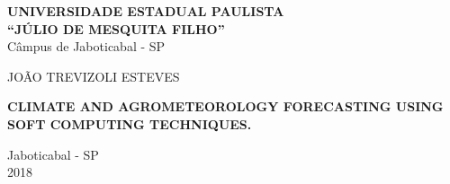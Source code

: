 \thispagestyle{empty}


\begin{center}
\textbf{UNIVERSIDADE ESTADUAL PAULISTA}\\
\textbf{``JÚLIO DE MESQUITA FILHO''}\\
Câmpus de Jaboticabal - SP
\end{center}

\vspace{3.5cm}
\centerline{{\normalsize{JOÃO TREVIZOLI ESTEVES}}}

\vspace*{4.5cm}


\begin{center}
\Large\textrm{\textbf{CLIMATE AND AGROMETEOROLOGY FORECASTING USING SOFT COMPUTING TECHNIQUES.}} %
\end{center}


\vspace*{9.0cm}
\begin{center}
Jaboticabal - SP\\ 
2018
\end{center}

\newpage
